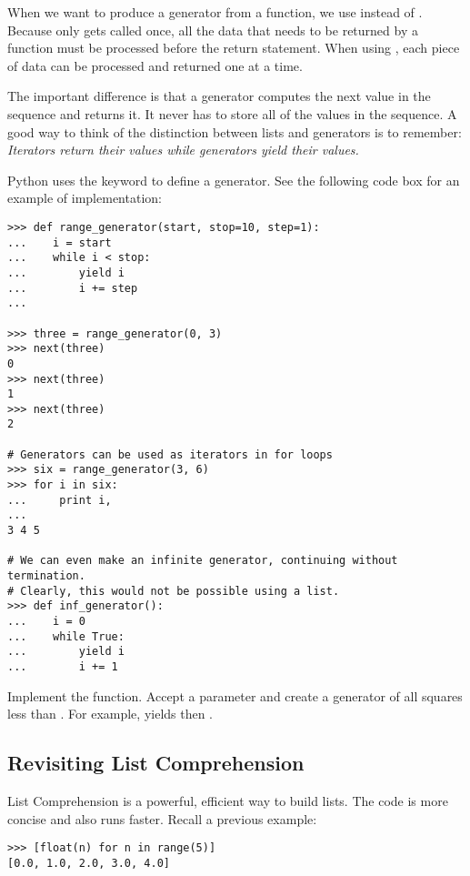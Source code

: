 When we want to produce a generator from a function, we use  instead of . Because  only gets called once, all the data that needs to be returned by a function must be processed before the return statement. When using , each piece of data can be processed and returned one at a time.

The important difference is that a generator computes the next value in the sequence and returns it. It never has to store all of the values in the sequence. A good way to think of the distinction between lists and generators is to remember: \emph{Iterators return their values while generators yield their values.}

Python uses the  keyword to define a generator. See the following code box for an example of implementation:
\begin{lstlisting}
>>> def range_generator(start, stop=10, step=1):
...    i = start
...    while i < stop:
...        yield i 
...        i += step
...

>>> three = range_generator(0, 3)
>>> next(three)
0
>>> next(three)
1
>>> next(three)
2

# Generators can be used as iterators in for loops
>>> six = range_generator(3, 6)
>>> for i in six:
...     print i,
...
3 4 5

# We can even make an infinite generator, continuing without termination.
# Clearly, this would not be possible using a list.
>>> def inf_generator():
...    i = 0
...    while True:
...        yield i
...        i += 1
\end{lstlisting}

\begin{problem}
Implement the  function.
Accept a parameter  and create a generator of all squares less than .
For example,  yields  then .
\end{problem}


\subsection*{Revisiting List Comprehension}
List Comprehension is a powerful, efficient way to build lists.
The code is more concise and also runs faster.
Recall a previous example:
\begin{lstlisting}
>>> [float(n) for n in range(5)]
[0.0, 1.0, 2.0, 3.0, 4.0]
\end{lstlisting}

